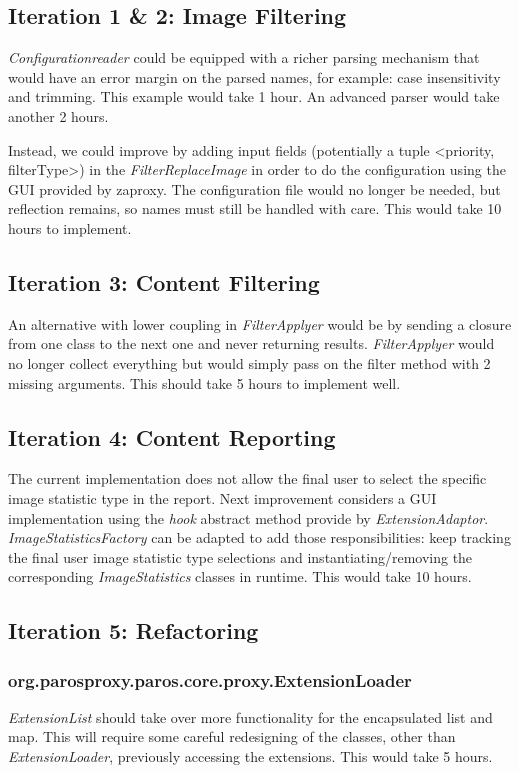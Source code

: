 \subsection{Iteration 1 \& 2: Image Filtering}


\textit{Configurationreader} could be equipped with a richer parsing mechanism that would have an error margin on the parsed names, for example: case insensitivity and trimming. This example would take 1 hour. An advanced parser would take another 2 hours.
\par
Instead, we could improve by adding input fields (potentially a tuple <priority, filterType>) in the \textit{FilterReplaceImage} in order to do the configuration using the GUI provided by zaproxy. The configuration file would no longer be needed, but reflection remains, so names must still be handled with care. This would take 10 hours to implement.
\subsection{Iteration 3: Content Filtering}
An alternative with lower coupling in \textit{FilterApplyer} would be by sending a closure from one class to the next one and never returning results. \textit{FilterApplyer} would no longer collect everything but would simply pass on the filter method with 2 missing arguments. This should take 5 hours to implement well.
\subsection{Iteration 4: Content Reporting}
The current implementation does not allow the final user to select the specific image statistic type in the report. Next improvement considers a GUI implementation using the \textit{hook} abstract method provide by \textit{ExtensionAdaptor}. \textit{ImageStatisticsFactory} can be adapted to add those responsibilities: keep tracking the final user image statistic type selections and instantiating/removing the corresponding \textit{ImageStatistics} classes in runtime. This would take 10 hours.

\subsection{Iteration 5: Refactoring}
\subsubsection{org.parosproxy.paros.core.proxy.ExtensionLoader}
\textit{ExtensionList} should take over more functionality for the encapsulated list and map. This will require some careful redesigning of the classes, other than \textit{ExtensionLoader}, previously accessing the extensions. This would take 5 hours.
